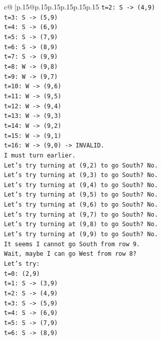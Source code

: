 \documentclass{article}
\begin{document}
{\begin{supertabular}{c@{$\;$}|p{.15\linewidth}@{}p{.15\linewidth}p{.15\linewidth}p{.15\linewidth}p{.15\linewidth}p{.15\linewidth}}
{{{\texttt{t=2: S {-}> (4,9)} \\
\texttt{t=3: S {-}> (5,9)} \\
\texttt{t=4: S {-}> (6,9)} \\
\texttt{t=5: S {-}> (7,9)} \\
\texttt{t=6: S {-}> (8,9)} \\
\texttt{t=7: S {-}> (9,9)} \\
\texttt{t=8: W {-}> (9,8)} \\
\texttt{t=9: W {-}> (9,7)} \\
\texttt{t=10: W {-}> (9,6)} \\
\texttt{t=11: W {-}> (9,5)} \\
\texttt{t=12: W {-}> (9,4)} \\
\texttt{t=13: W {-}> (9,3)} \\
\texttt{t=14: W {-}> (9,2)} \\
\texttt{t=15: W {-}> (9,1)} \\
\texttt{t=16: W {-}> (9,0) {-}> INVALID.} \\
\texttt{I must turn earlier.} \\
\texttt{Let's try turning at (9,2) to go South? No.} \\
\texttt{Let's try turning at (9,3) to go South? No.} \\
\texttt{Let's try turning at (9,4) to go South? No.} \\
\texttt{Let's try turning at (9,5) to go South? No.} \\
\texttt{Let's try turning at (9,6) to go South? No.} \\
\texttt{Let's try turning at (9,7) to go South? No.} \\
\texttt{Let's try turning at (9,8) to go South? No.} \\
\texttt{Let's try turning at (9,9) to go South? No.} \\
\texttt{It seems I cannot go South from row 9.} \\
\texttt{Wait, maybe I can go West from row 8?} \\
\texttt{Let's try:} \\
\texttt{t=0: (2,9)} \\
\texttt{t=1: S {-}> (3,9)} \\
\texttt{t=2: S {-}> (4,9)} \\
\texttt{t=3: S {-}> (5,9)} \\
\texttt{t=4: S {-}> (6,9)} \\
\texttt{t=5: S {-}> (7,9)} \\
\texttt{t=6: S {-}> (8,9)} \\
}}}
\end{supertabular}}
\end{document}
